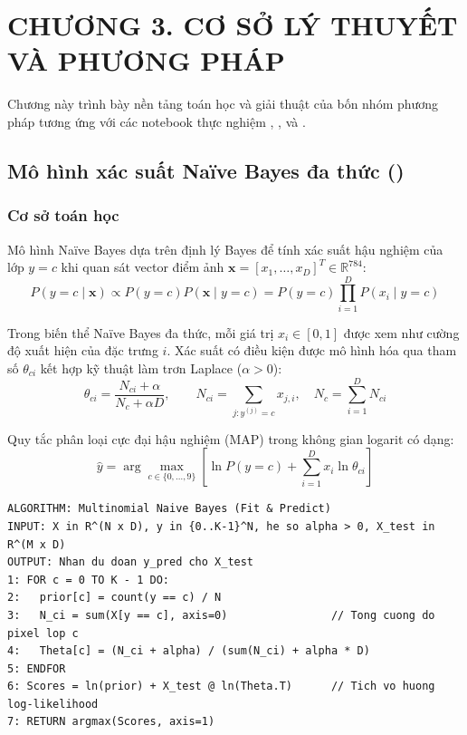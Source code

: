 \section*{CHƯƠNG 3. CƠ SỞ LÝ THUYẾT VÀ PHƯƠNG PHÁP}
\setcounter{section}{3}
\setcounter{subsection}{0}

Chương này trình bày nền tảng toán học và giải thuật của bốn nhóm phương pháp tương ứng với các notebook thực nghiệm , ,  và .

\subsection{Mô hình xác suất Naïve Bayes đa thức ()}
\subsubsection{Cơ sở toán học}
Mô hình Naïve Bayes dựa trên định lý Bayes để tính xác suất hậu nghiệm của lớp $y = c$ khi quan sát vector điểm ảnh $\mathbf{x} = [x_1, \dots, x_D]^T \in \mathbb{R}^{784}$:
\begin{equation}
    P(y = c \mid \mathbf{x}) \propto P(y = c) P(\mathbf{x} \mid y = c) = P(y = c) \prod_{i=1}^D P(x_i \mid y = c)
\end{equation}

Trong biến thể Naïve Bayes đa thức, mỗi giá trị $x_i \in [0, 1]$ được xem như cường độ xuất hiện của đặc trưng $i$. Xác suất có điều kiện được mô hình hóa qua tham số $\theta_{ci}$ kết hợp kỹ thuật làm trơn Laplace ($\alpha > 0$):
\begin{equation}
    \theta_{ci} = \frac{N_{ci} + \alpha}{N_c + \alpha D}, \qquad N_{ci} = \sum_{j: y^{(j)}=c} x_{j, i}, \quad N_c = \sum_{i=1}^D N_{ci}
\end{equation}

Quy tắc phân loại cực đại hậu nghiệm (MAP) trong không gian logarit có dạng:
\begin{equation}
    \hat{y} = \arg\max_{c \in \{0, \dots, 9\}} \left[ \ln P(y = c) + \sum_{i=1}^D x_i \ln \theta_{ci} \right]
\end{equation}

\begin{lstlisting}[style=pseudocode, caption={Thuật toán Multinomial Naïve Bayes (Laplace Smoothing)}]
ALGORITHM: Multinomial Naive Bayes (Fit & Predict)
INPUT: X in R^(N x D), y in {0..K-1}^N, he so alpha > 0, X_test in R^(M x D)
OUTPUT: Nhan du doan y_pred cho X_test
1: FOR c = 0 TO K - 1 DO:
2:   prior[c] = count(y == c) / N
3:   N_ci = sum(X[y == c], axis=0)                // Tong cuong do pixel lop c
4:   Theta[c] = (N_ci + alpha) / (sum(N_ci) + alpha * D)
5: ENDFOR
6: Scores = ln(prior) + X_test @ ln(Theta.T)      // Tich vo huong log-likelihood
7: RETURN argmax(Scores, axis=1)
\end{lstlisting}

